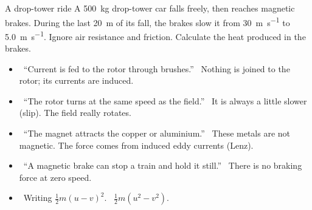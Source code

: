 \begin{workedexample}{A drop-tower ride}\label{ch5:we:droptower}
A \qty{500}{kg} drop-tower car falls freely, then reaches magnetic brakes. During the
last \qty{20}{m} of its fall, the brakes slow it from \qty{30}{m.s^{-1}} to
\qty{5.0}{m.s^{-1}}. Ignore air resistance and friction. Calculate the heat produced in
the brakes.
\end{workedexample}

\begin{mistakes}
\begin{itemize}
  \item \xmark\ ``Current is fed to the rotor through brushes.'' \cmark\ Nothing is
        joined to the rotor; its currents are induced.
  \item \xmark\ ``The rotor turns at the same speed as the field.'' \cmark\ It is always
        a little slower (slip). The field really rotates.
  \item \xmark\ ``The magnet attracts the copper or aluminium.'' \cmark\ These metals are
        not magnetic. The force comes from induced eddy currents (Lenz).
  \item \xmark\ ``A magnetic brake can stop a train and hold it still.'' \cmark\ There
        is no braking force at zero speed.
  \item \xmark\ Writing $\frac{1}{2}m(u - v)^2$. \cmark\ $\frac{1}{2}m(u^2 - v^2)$.
\end{itemize}
\end{mistakes}

